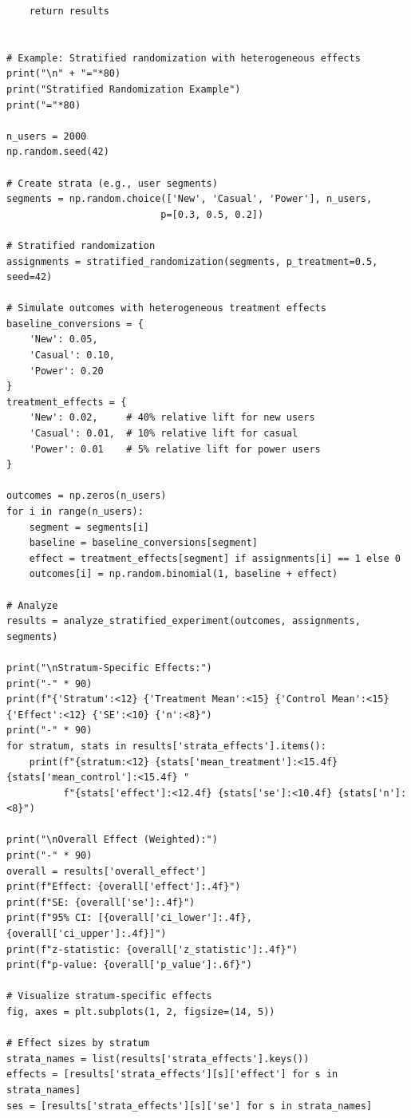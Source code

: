 \begin{lstlisting}
    return results


# Example: Stratified randomization with heterogeneous effects
print("\n" + "="*80)
print("Stratified Randomization Example")
print("="*80)

n_users = 2000
np.random.seed(42)

# Create strata (e.g., user segments)
segments = np.random.choice(['New', 'Casual', 'Power'], n_users,
                           p=[0.3, 0.5, 0.2])

# Stratified randomization
assignments = stratified_randomization(segments, p_treatment=0.5, seed=42)

# Simulate outcomes with heterogeneous treatment effects
baseline_conversions = {
    'New': 0.05,
    'Casual': 0.10,
    'Power': 0.20
}
treatment_effects = {
    'New': 0.02,     # 40% relative lift for new users
    'Casual': 0.01,  # 10% relative lift for casual
    'Power': 0.01    # 5% relative lift for power users
}

outcomes = np.zeros(n_users)
for i in range(n_users):
    segment = segments[i]
    baseline = baseline_conversions[segment]
    effect = treatment_effects[segment] if assignments[i] == 1 else 0
    outcomes[i] = np.random.binomial(1, baseline + effect)

# Analyze
results = analyze_stratified_experiment(outcomes, assignments, segments)

print("\nStratum-Specific Effects:")
print("-" * 90)
print(f"{'Stratum':<12} {'Treatment Mean':<15} {'Control Mean':<15} {'Effect':<12} {'SE':<10} {'n':<8}")
print("-" * 90)
for stratum, stats in results['strata_effects'].items():
    print(f"{stratum:<12} {stats['mean_treatment']:<15.4f} {stats['mean_control']:<15.4f} "
          f"{stats['effect']:<12.4f} {stats['se']:<10.4f} {stats['n']:<8}")

print("\nOverall Effect (Weighted):")
print("-" * 90)
overall = results['overall_effect']
print(f"Effect: {overall['effect']:.4f}")
print(f"SE: {overall['se']:.4f}")
print(f"95% CI: [{overall['ci_lower']:.4f}, {overall['ci_upper']:.4f}]")
print(f"z-statistic: {overall['z_statistic']:.4f}")
print(f"p-value: {overall['p_value']:.6f}")

# Visualize stratum-specific effects
fig, axes = plt.subplots(1, 2, figsize=(14, 5))

# Effect sizes by stratum
strata_names = list(results['strata_effects'].keys())
effects = [results['strata_effects'][s]['effect'] for s in strata_names]
ses = [results['strata_effects'][s]['se'] for s in strata_names]


\end{lstlisting}
